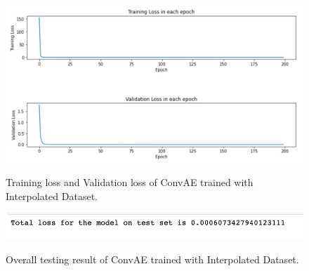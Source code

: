 \begin{figure}[H]
    \caption{Training loss and Validation loss of ConvAE trained with Interpolated Dataset.}
    \includegraphics[scale=0.6]{figures/mantle_convection_images/larger_dataset_interpolated/ConvAE_trainingData.png}
    \label{figure:ConvAE_interpolated_losses}
\end{figure}

\begin{figure}[H]
    \caption{Overall testing result of ConvAE trained with Interpolated Dataset.}
    \includegraphics[scale=0.8]{figures/mantle_convection_images/larger_dataset_interpolated/ConvAE_OverallTesting.png}
    \label{figure:ConvAE_interpolated_testing}
\end{figure}

